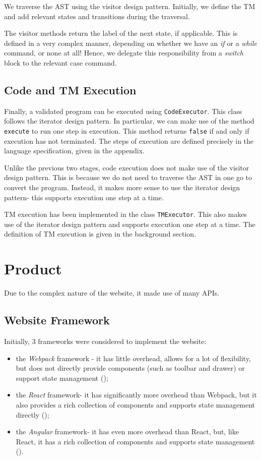 We traverse the AST using the visitor design pattern. Initially, we define the TM and add relevant states and transitions during the traversal. 

The visitor methods return the label of the next state, if applicable. This is defined in a very complex manner, depending on whether we have an \textit{if} or a \textit{while} command, or none at all! Hence, we delegate this responsibility from a \textit{switch} block to the relevant case command.

\subsection{Code and TM Execution}
Finally, a validated program can be executed using \texttt{CodeExecutor}. This class follows the iterator design pattern. In particular, we can make use of the method \texttt{execute} to run one step in execution. This method returns \texttt{false} if and only if execution has not terminated. The steps of execution are defined precisely in the language specification, given in the appendix.

Unlike the previous two stages, code execution does not make use of the visitor design pattern. This is because we do not need to traverse the AST in one go to convert the program. Instead, it makes more sense to use the iterator design pattern- this supports execution one step at a time.

TM execution has been implemented in the class \texttt{TMExecutor}. This also makes use of the iterator design pattern and supports execution one step at a time. The definition of TM execution is given in the background section.

\section{Product}

Due to the complex nature of the website, it made use of many APIs.

\subsection{Website Framework}

Initially, 3 frameworks were considered to implement the website:
\begin{itemize}
    \item the \emph{Webpack} framework - it has little overhead, allows for a lot of flexibility, but does not directly provide components (such as toolbar and drawer) or support state management (\cite{webpack});
    \item the \emph{React} framework- it has significantly more overhead than Webpack, but it also provides a rich collection of components and supports state management directly (\cite{react});
    \item the \emph{Angular} framework- it has even more overhead than React, but, like React, it has a rich collection of components and supports state management (\cite{angular}).
\end{itemize}

